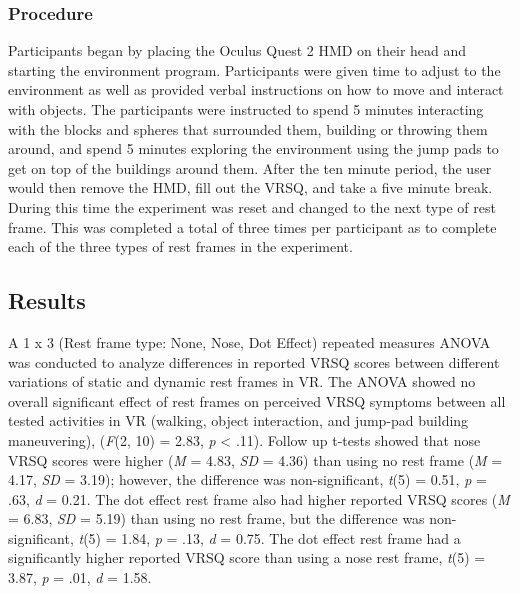 \documentclass[sigconf]{acmart}
\begin{document}
\subsubsection{Procedure}
Participants began by placing the Oculus Quest 2 HMD on their head and starting the environment program. Participants were given time to adjust to the environment as well as provided verbal instructions on how to move and interact with objects. The participants were instructed to spend 5 minutes interacting with the blocks and spheres that surrounded them, building or throwing them around, and spend 5 minutes exploring the environment using the jump pads to get on top of the buildings around them. After the ten minute period, the user would then remove the HMD, fill out the VRSQ, and take a five minute break. During this time the experiment was reset and changed to the next type of rest frame. This was completed a total of three times per participant as to complete each of the three types of rest frames in the experiment. 

\subsection{Results}
A 1 x 3 (Rest frame type: None, Nose, Dot Effect) repeated measures ANOVA was conducted to analyze differences in reported VRSQ scores between different variations of static and dynamic rest frames in VR. The ANOVA showed no overall significant effect of rest frames on perceived VRSQ symptoms between all tested activities in VR (walking, object interaction, and jump-pad building maneuvering), (\textit{F}(2, 10) = 2.83, \textit{p} < .11). Follow up t-tests showed that nose VRSQ scores were higher (\textit{M} = 4.83, \textit{SD} = 4.36) than using no rest frame (\textit{M} = 4.17, \textit{SD} = 3.19); however, the difference was non-significant, \textit{t}(5) = 0.51, \textit{p} = .63, \textit{d} = 0.21. The dot effect rest frame also had higher reported VRSQ scores (\textit{M} = 6.83, \textit{SD} = 5.19) than using no rest frame, but the difference was non-significant, \textit{t}(5) = 1.84, \textit{p} = .13, \textit{d} = 0.75. The dot effect rest frame had a significantly higher reported VRSQ score than using a nose rest frame, \textit{t}(5) = 3.87, \textit{p} = .01, \textit{d} = 1.58. 
\end{document}
